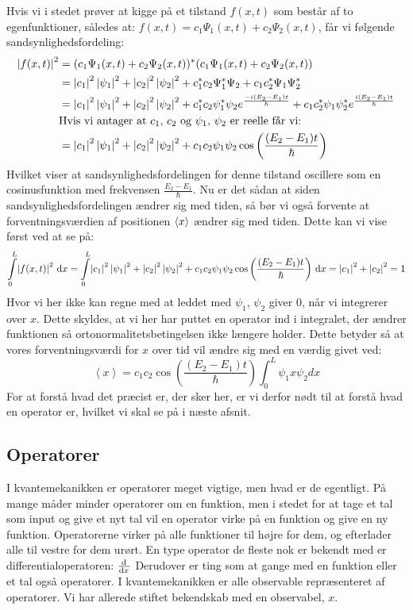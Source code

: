 \documentclass[../Kvantemekanik.tex]{subfiles}
\begin{document}
Hvis vi i stedet prøver at kigge på et tilstand $f(x,t)$ som består af to egenfunktioner, således at: $f(x,t)=c_1\Psi_1(x,t)+c_2\Psi_2(x,t)$, får vi følgende sandsynlighedsfordeling:
\begin{align*}
    \abs{f(x,t)}^2&=(c_1\Psi_1(x,t)+c_2\Psi_2(x,t))^{*}(c_1\Psi_1(x,t)+c_2\Psi_2(x,t))\\
    &=\abs{c_1}^{2}\abs{\psi_1}^{2}+\abs{c_2}^{2}\abs{\psi_2}^{2}+c_1^{*}c_2\Psi_1^{*}\Psi_2+c_1c_2^{*}\Psi_1\Psi_2^{*}\\
    &=\abs{c_1}^{2}\abs{\psi_1}^{2}+\abs{c_2}^{2}\abs{\psi_2}^{2}+c_1^{*}c_2\psi_1^{*}\psi_2e^{\frac{-i(E_2-E_1)t}{\hbar}}+c_1c_2^{*}\psi_1\psi_2^{*}e^{\frac{i(E_2-E_1)t}{\hbar}}\\
    &\text{Hvis vi antager at $c_1$, $c_2$ og $\psi_1$, $\psi_2$ er reelle får vi:}\\
    &=\abs{c_1}^{2}\abs{\psi_1}^{2}+\abs{c_2}^{2}\abs{\psi_2}^{2}+c_1c_2\psi_1\psi_2\cos\left(\frac{(E_2-E_1)t}{\hbar}\right)
\end{align*}
Hvilket viser at sandsynlighedsfordelingen for denne tilstand oscillere som en cosinusfunktion med frekvensen $\frac{E_2-E_1}{\hbar}$. Nu er det sådan at siden sandsynlighedsfordelingen ændrer sig med tiden, så bør vi også forvente at forventningsværdien af positionen $\expect x$ ændrer sig med tiden. Dette kan vi vise først ved at se på:
\begin{equation*}
    \integral{\abs{f(x,t)}^2}{x}{0}{L}=\integral{\abs{c_1}^{2}\abs{\psi_1}^{2}+\abs{c_2}^{2}\abs{\psi_2}^{2}+c_1c_2\psi_1\psi_2\cos\left(\frac{(E_2-E_1)t}{\hbar}\right)}{x}{0}{L}=\abs{c_1}^2+\abs{c_2}^2=1
\end{equation*}
Hvor vi her ikke kan regne med at leddet med $\psi_1$, $\psi_2$ giver 0, når vi integrerer over $x$. Dette skyldes, at vi her har puttet en operator ind i integralet, der ændrer funktionen så ortonormalitetsbetingelsen ikke længere holder. Dette betyder så at vores forventningsværdi for $x$ over tid vil ændre sig med en værdig givet ved:
\begin{equation*}
    \left<x\right>=c_1c_2\cos\left( \frac{(E_{2}-E_{1})t}{\hbar}\right)\int_{0}^{L}\psi_1x\psi_2 dx
\end{equation*}
For at forstå hvad det præcist er, der sker her, er vi derfor nødt til at forstå hvad en operator er, hvilket vi skal se på i næste afsnit.
\subsection*{Operatorer}
I kvantemekanikken er operatorer meget vigtige, men hvad er de egentligt. På mange måder minder operatorer om en funktion, men i stedet for at tage et tal som input og give et nyt tal vil en operator virke på en funktion og give en ny funktion. Operatorerne virker på alle funktioner til højre for dem, og efterlader alle til vestre for dem urørt.
En type operator de fleste nok er bekendt med er differentialoperatoren: $\dif{x}{}$ Derudover er ting som at gange med en funktion eller et tal også operatorer. I kvantemekanikken er alle observable repræsenteret af operatorer. Vi har allerede stiftet bekendskab med en observabel, $x$.
\end{document}
